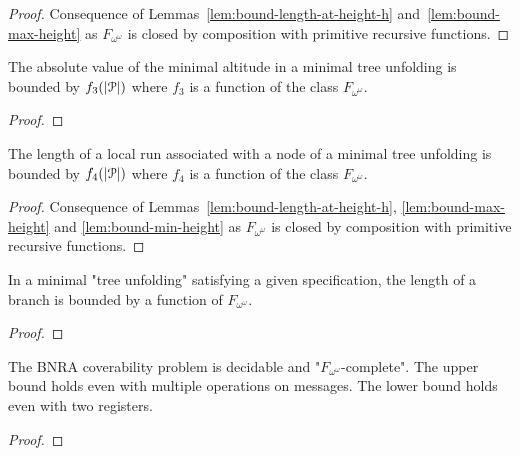 \begin{proof}
	Consequence of Lemmas~\ref{lem:bound-length-at-height-h} and~\ref{lem:bound-max-height} as $F_{\omega^\omega}$ is closed by composition with primitive recursive functions.
\end{proof}

\begin{lemma}
	\label{lem:bound-min-height}
	The absolute value of the minimal altitude in a minimal tree unfolding is bounded by $f_3(|\mathcal{P}|)$ where $f_3$ is a function of the class $F_{\omega^\omega}$.
\end{lemma}

\begin{proof}
\end{proof}

\begin{corollary}
	\label{lem:bound-node-size}
	The length of a local run associated with a node of a minimal tree unfolding is bounded by $f_4(|\mathcal{P}|)$ where $f_4$ is a function of the class $F_{\omega^\omega}$.
\end{corollary}

\begin{proof}
	Consequence of Lemmas~\ref{lem:bound-length-at-height-h}, \ref{lem:bound-max-height} and \ref{lem:bound-min-height} as $F_{\omega^\omega}$ is closed by composition with primitive recursive functions.
\end{proof}

\begin{proposition}
	In a minimal "tree unfolding" satisfying a given specification, the length of a branch is bounded by a function of $F_{\omega^\omega}$.
\end{proposition}

\begin{proof}
\end{proof}

%





\begin{theorem}
	The BNRA coverability problem is decidable and "$F_{\omega^\omega}$-complete".
	The upper bound holds even with multiple operations on messages.
	The lower bound holds even with two registers.
\end{theorem}

\begin{proof}
\end{proof}
